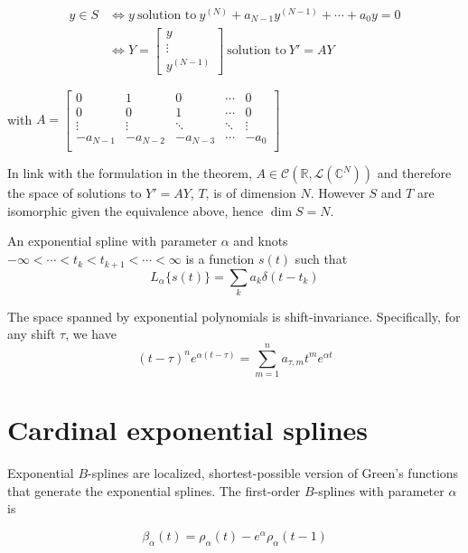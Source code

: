 \documentclass[a4paper, 11pt]{article}
\begin{document}
\begin{align*}
  y \in S &\iff y \ \text{solution to} \ y^{(N)} + a_{N-1} y^{(N-1)} + \cdots + a_0 y =0 \\
  &\iff Y = \begin{bmatrix} y \\ \vdots \\ y^{(N-1)} \end{bmatrix} \ \text{solution to} \ Y' = AY
\end{align*}

with $A = \begin{bmatrix} 0 & 1 & 0 & \cdots & 0 \\
  0 & 0 & 1 & \cdots & 0 \\
  \vdots & \vdots & \ddots & \ddots & \vdots \\
  -a_{N-1} & -a_{N-2} & -a_{N-3} & \cdots & -a_0  \\
\end{bmatrix}$

In link with the formulation in the theorem, $A \in \mathcal{C}(\mathbb{R}, \mathcal{L}(\mathbb{C}^N))$ and therefore 
the space of solutions to $Y'=AY$, $T$, is of dimension $N$. However $S$ and $T$ are isomorphic given the equivalence 
above, hence $\dim{S} = N$.

\begin{deftn}{1}
  An exponential spline with parameter $\alpha$ and knots $-\infty < \cdots < t_{k} < t_{k+1} < \cdots < \infty$ is a 
  function $s(t)$ such that
  \begin{equation*}
    L_{\alpha}\{s(t)\} = \sum_{k} a_k \delta(t-t_k)
  \end{equation*}
\end{deftn}

The space spanned by exponential polynomials is shift-invariance. Specifically, for any shift $\tau$, we have
\begin{equation*}
  {(t-\tau)}^n e^{\alpha(t-\tau)} = \sum_{m=1}^n a_{\tau, m} t^m e^{\alpha t}
\end{equation*}

\section{Cardinal exponential splines}

Exponential $B$-splines are localized, shortest-possible version of Green's functions that generate the exponential 
splines. The first-order $B$-splines with parameter $\alpha$ is 

\begin{equation}
  \beta_{\alpha}(t) = \rho_{\alpha}(t) - e^{\alpha} \rho_{\alpha}(t-1)
\end{equation}
\end{document}
